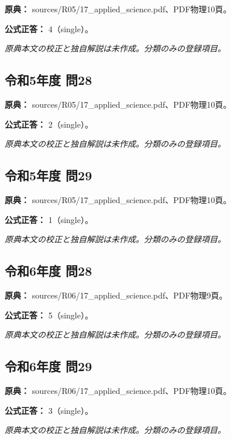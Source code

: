 \noindent\textbf{原典：} sources/R05/17\_applied\_science.pdf、PDF物理10頁。

\textbf{公式正答：} 4（single）。

\par\textit{原典本文の校正と独自解説は未作成。分類のみの登録項目。}

\subsection{令和5年度 問28}
\label{q:r05-reg-applied-28}

\noindent\textbf{原典：} sources/R05/17\_applied\_science.pdf、PDF物理10頁。

\textbf{公式正答：} 2（single）。

\par\textit{原典本文の校正と独自解説は未作成。分類のみの登録項目。}

\subsection{令和5年度 問29}
\label{q:r05-reg-applied-29}

\noindent\textbf{原典：} sources/R05/17\_applied\_science.pdf、PDF物理10頁。

\textbf{公式正答：} 1（single）。

\par\textit{原典本文の校正と独自解説は未作成。分類のみの登録項目。}

\subsection{令和6年度 問28}
\label{q:r06-reg-applied-28}

\noindent\textbf{原典：} sources/R06/17\_applied\_science.pdf、PDF物理9頁。

\textbf{公式正答：} 5（single）。

\par\textit{原典本文の校正と独自解説は未作成。分類のみの登録項目。}

\subsection{令和6年度 問29}
\label{q:r06-reg-applied-29}

\noindent\textbf{原典：} sources/R06/17\_applied\_science.pdf、PDF物理10頁。

\textbf{公式正答：} 3（single）。

\par\textit{原典本文の校正と独自解説は未作成。分類のみの登録項目。}

